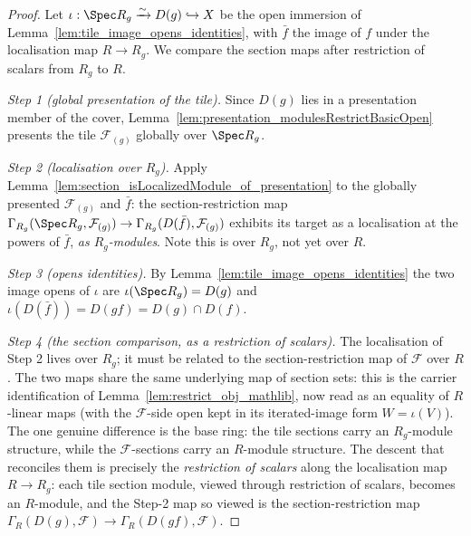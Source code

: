 \begin{proof}
  Let \(\iota : \Spec R_g \xrightarrow{\sim} D(g) \hookrightarrow X\) be the open immersion of
  Lemma~\ref{lem:tile_image_opens_identities}, with \(\bar f\) the image of \(f\) under the
  localisation map \(R \to R_g\). We compare the section maps after restriction of
  scalars from \(R_g\) to \(R\).

  \emph{Step 1 (global presentation of the tile).} Since \(D(g)\) lies in a presentation member of the
  cover, Lemma~\ref{lem:presentation_modulesRestrictBasicOpen} presents the tile
  \(\mathcal{F}_{(g)}\) globally over \(\Spec R_g\).

  \emph{Step 2 (localisation over \(R_g\)).} Apply
  Lemma~\ref{lem:section_isLocalizedModule_of_presentation} to the globally presented
  \(\mathcal{F}_{(g)}\) and \(\bar f\): the section-restriction map
  \(\Gamma_{R_g}(\Spec R_g, \mathcal{F}_{(g)}) \to \Gamma_{R_g}(D(\bar f), \mathcal{F}_{(g)})\)
  exhibits its target as a localisation at the powers of \(\bar f\), \emph{as \(R_g\)-modules}. Note this
  is over \(R_g\), not yet over \(R\).

  \emph{Step 3 (opens identities).} By Lemma~\ref{lem:tile_image_opens_identities} the two image opens of
  \(\iota\) are \(\iota(\Spec R_g) = D(g)\) and \(\iota(D(\bar f)) = D(gf) = D(g) \cap D(f)\).

  \emph{Step 4 (the section comparison, as a restriction of scalars).} The localisation of Step 2 lives
  over \(R_g\); it must be related to the section-restriction map of \(\mathcal{F}\) over \(R\). The two
  maps share the same underlying map of section sets: this is the carrier identification of
  Lemma~\ref{lem:restrict_obj_mathlib}, now read as an equality of \(R\)-linear maps (with the
  \(\mathcal{F}\)-side open kept in its iterated-image form \(W = \iota(V)\)). The one genuine difference
  is the base ring: the tile sections carry an \(R_g\)-module structure, while the
  \(\mathcal{F}\)-sections carry an \(R\)-module structure. The descent that reconciles them is precisely
  the \emph{restriction of scalars} along the localisation map \(R \to R_g\): each tile section module,
  viewed through restriction of scalars, becomes an \(R\)-module, and the Step-2 map so viewed is the
  section-restriction map \(\Gamma_R(D(g), \mathcal{F}) \to \Gamma_R(D(gf), \mathcal{F})\).


\end{proof}

